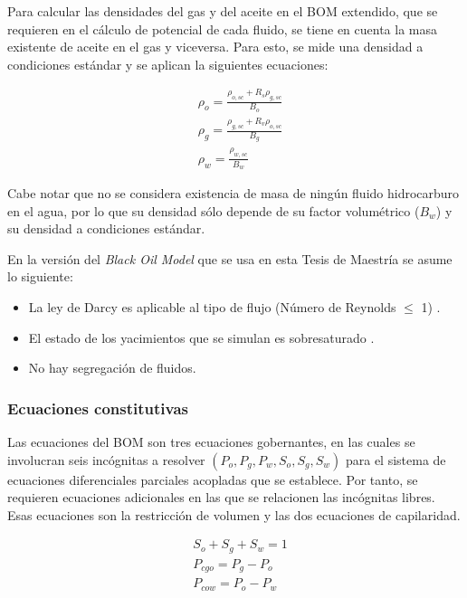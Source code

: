 Para calcular las densidades del gas y del aceite en el BOM extendido, que se requieren en el cálculo de potencial de cada fluido, se tiene en cuenta la masa existente de aceite en el gas y viceversa. Para esto, se mide una densidad a condiciones estándar y se aplican la siguientes ecuaciones:

\begin{align}
	\label{ec:oildensity}&\rho_{o} = \frac{\rho_{o,sc} + R_{s}\rho_{g,sc}}{B_{o}}\\
	\label{ec:gasdensity}&\rho_{g} = \frac{\rho_{g,sc} + R_{v}\rho_{o,sc}}{B_{g}}\\
	\label{ec:watdensity}&\rho_{w} = \frac{\rho_{w,sc}}{B_{w}}
\end{align}

Cabe notar que no se considera existencia de masa de ningún fluido hidrocarburo en el agua, por lo que su densidad sólo depende de su factor volumétrico ($B_{w}$) y su densidad a condiciones estándar.

En la versión del \textit{Black Oil Model} que se usa en esta Tesis de Maestría se asume lo siguiente:
\begin{itemize}
	\item La ley de Darcy es aplicable al tipo de flujo (Número de Reynolds $\le$ 1) \citep{takhanov2011forchheimer}.
	\item El estado de los yacimientos que se simulan es sobresaturado \citep{chen2007reservoir}.
	\item No hay segregación de fluidos.
\end{itemize}

\subsubsection{Ecuaciones constitutivas}

Las ecuaciones del BOM son tres ecuaciones gobernantes, en las cuales se involucran seis incógnitas a resolver $\left(P_{o}, P_{g}, P_{w}, S_{o}, S_{g}, S_{w}\right)$ para el sistema de ecuaciones diferenciales parciales acopladas que se establece. Por tanto, se requieren ecuaciones adicionales en las que se relacionen las incógnitas libres. Esas ecuaciones son la restricción de volumen y las dos ecuaciones de capilaridad.

\begin{align}
	\label{ec:volumeRes}&S_{o}+S_{g}+S_{w} = 1\\
	\label{ec:CapillaryGas}&P_{cgo} = P_{g} - P_{o}\\
	\label{ec:CapillaryWater}&P_{cow} = P_{o} - P_{w}
\end{align}

